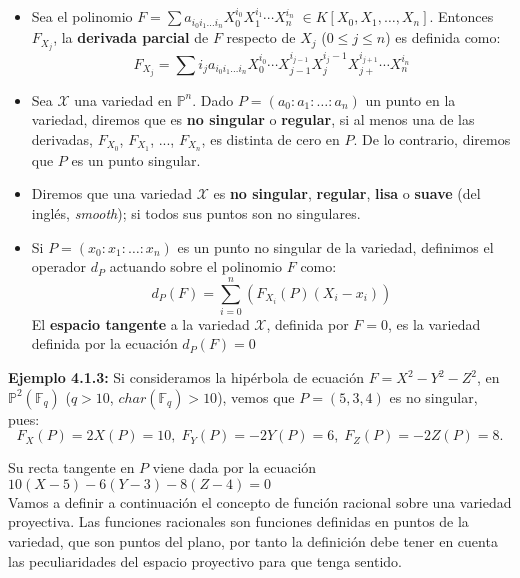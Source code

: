 \documentclass[11pt,spanish]{book}
\begin{document}
\begin{itemize}
    \item Sea el polinomio $F=\sum a_{i_0 i_1\ldots i_n} X_{0}^{i_0}X_{1}^{i_1}\cdots X_{n}^{i_n}\;\in K[X_0,X_1,\ldots,X_n]$. Entonces $F_{X_j}$, la \textbf{derivada parcial} de $F$ respecto de $X_j$ ($0\leq j\leq n$) es definida como:
$$ F_{X_j} =\sum i_{j}a_{i_0 i_1\ldots i_n}X_0^{i_0}\cdots X_{j-1}^{i_{j-1}}X_{j}^{i_{j}-1} X_{j+}^{i_{j+1}}\cdots X_{n}^{i_n} $$
\item Sea $\mathbf{\mathcal{X}}$ una variedad en $\mathbb{P}^n$. Dado $P=(a_0:a_1:\ldots :a_n)$ un punto en la variedad, diremos que es \textbf{no singular} o \textbf{regular}, si al menos una de las derivadas, $F_{X_0}$, $F_{X_1}$, ..., $F_{X_n}$, es distinta de cero en $P$. De lo contrario, diremos que $P$ es un punto singular.
\item Diremos que una variedad $\mathbf{\mathcal{X}}$ es \textbf{no singular}, \textbf{regular}, \textbf{lisa} o \textbf{suave} (del inglés, \textit{smooth}); si todos sus puntos son no singulares.
\item Si $P=(x_0:x_1:\ldots:x_n)$ es un punto no singular de la variedad, definimos el operador $d_P$ actuando sobre el polinomio $F$ como:
$$d_P(F)=\sum_{i=0}^{n}(F_{X_i}(P)(X_{i}-x_{i}))$$
El \textbf{espacio tangente} a la variedad $\mathbf{\mathcal{X}}$, definida por $F=0$, es la variedad definida por la ecuación $d_P(F)=0$
\end{itemize}
\textbf{Ejemplo 4.1.3: } Si consideramos la hipérbola de ecuación $F=X^2-Y^2-Z^2$, en $\mathbb{P}^2(\mathbb{F}_{q})$ ($q>10$, $char(\mathbb{F}_{q})>10$), vemos que $P=(5,3,4)$ es no singular, pues: $$F_X(P)=2X(P)=10,\; F_Y(P)=-2Y(P)=6,\;F_Z(P)=-2Z(P)=8.$$ 

Su recta tangente en $P$ viene dada por la ecuación $10(X-5)-6(Y-3)-8(Z-4)=0$\\

Vamos a definir a continuación el concepto de función racional sobre una variedad proyectiva. Las funciones racionales son funciones definidas en puntos de la variedad, que son puntos del plano, por tanto la definición debe tener en cuenta las peculiaridades del espacio proyectivo para que tenga sentido.\\
\end{document}

